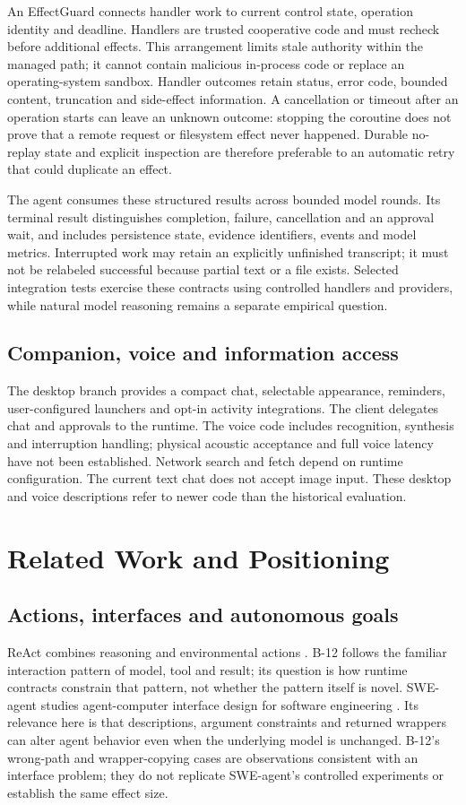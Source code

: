 \documentclass[11pt,a4paper]{article}
\begin{document}
An EffectGuard connects handler work to current control state, operation identity and deadline. Handlers are trusted cooperative code and must recheck before additional effects. This arrangement limits stale authority within the managed path; it cannot contain malicious in-process code or replace an operating-system sandbox. Handler outcomes retain status, error code, bounded content, truncation and side-effect information. A cancellation or timeout after an operation starts can leave an unknown outcome: stopping the coroutine does not prove that a remote request or filesystem effect never happened. Durable no-replay state and explicit inspection are therefore preferable to an automatic retry that could duplicate an effect.

The agent consumes these structured results across bounded model rounds. Its terminal result distinguishes completion, failure, cancellation and an approval wait, and includes persistence state, evidence identifiers, events and model metrics. Interrupted work may retain an explicitly unfinished transcript; it must not be relabeled successful because partial text or a file exists. Selected integration tests exercise these contracts using controlled handlers and providers, while natural model reasoning remains a separate empirical question.

\subsection{Companion, voice and information access}
The desktop branch provides a compact chat, selectable appearance, reminders, user-configured launchers and opt-in activity integrations. The client delegates chat and approvals to the runtime. The voice code includes recognition, synthesis and interruption handling; physical acoustic acceptance and full voice latency have not been established. Network search and fetch depend on runtime configuration. The current text chat does not accept image input. These desktop and voice descriptions refer to newer code than the historical evaluation.


\section{Related Work and Positioning}\label{sec:related}
\subsection{Actions, interfaces and autonomous goals}
ReAct combines reasoning and environmental actions \cite{react}. B-12 follows the familiar interaction pattern of model, tool and result; its question is how runtime contracts constrain that pattern, not whether the pattern itself is novel. SWE-agent studies agent-computer interface design for software engineering \cite{swe}. Its relevance here is that descriptions, argument constraints and returned wrappers can alter agent behavior even when the underlying model is unchanged. B-12's wrong-path and wrapper-copying cases are observations consistent with an interface problem; they do not replicate SWE-agent's controlled experiments or establish the same effect size.
\end{document}
